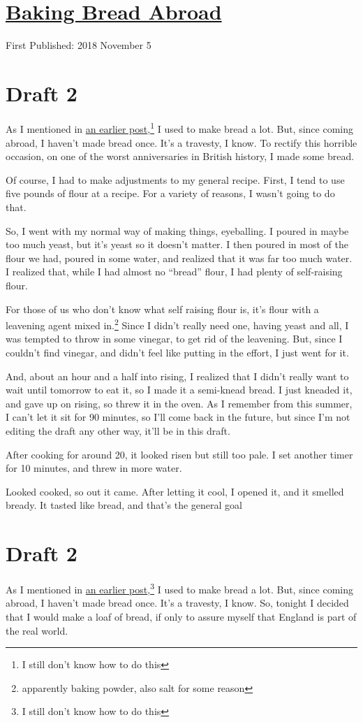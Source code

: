 \documentclass[12pt]{article}[titlepage]
\newcommand{\say}[1]{``#1''}
\newcommand{\1}{\={a}}
\newcommand{\2}{\={e}}
\newcommand{\3}{\={\i}}
\newcommand{\4}{\=o}
\newcommand{\5}{\=u}
\newcommand{\6}{\={A}}
\renewcommand{\,}{\textsuperscript{,}}
\begin{document}

\doublespacing
\section{\href{baking-bread-abroad.html}{Baking Bread Abroad}}
First Published: 2018 November 5
\section{Draft 2}
As I mentioned in \href{basic-bread-recipe.html}{an earlier post},\footnote{I still don't know how to do this} I used to make bread a lot.
But, since coming abroad, I haven't made bread once.
It's a travesty, I know.
To rectify this horrible occasion, on one of the worst anniversaries in British history, I made some bread.

Of course, I had to make adjustments to my general recipe.
First, I tend to use five pounds of flour at a recipe.
For a variety of reasons, I wasn't going to do that.

So, I went with my normal way of making things, eyeballing.
I poured in maybe too much yeast, but it's yeast so it doesn't matter.
I then poured in most of the flour we had, poured in some water, and realized that it was far too much water.
I realized that, while I had almost no \say{bread} flour, I had plenty of self-raising flour.

For those of us who don't know what self raising flour is, it's flour with a leavening agent mixed in.\footnote{apparently baking powder, also salt for some reason}
Since I didn't really need one, having yeast and all, I was tempted to throw in some vinegar, to get rid of the leavening.
But, since I couldn't find vinegar, and didn't feel like putting in the effort, I just went for it.

And, about an hour and a half into rising, I realized that I didn't really want to wait until tomorrow to eat it, so I made it a semi-knead bread.
I just kneaded it, and gave up on rising, so threw it in the oven.
As I remember from this summer, I can't let it sit for 90 minutes, so I'll come back in the future, but since I'm not editing the draft any other way, it'll be in this draft.

After cooking for around 20, it looked risen but still too pale.
I set another timer for 10 minutes, and threw in more water.

Looked cooked, so out it came.
After letting it cool, I opened it, and it smelled bready.
It tasted like bread, and that's the general goal
\section{Draft 2}
As I mentioned in \href{basic-bread-recipe.html}{an earlier post},\footnote{I still don't know how to do this} I used to make bread a lot.
But, since coming abroad, I haven't made bread once.
It's a travesty, I know.
So, tonight I decided that I would make a loaf of bread, if only to assure myself that England is part of the real world.
\end{document}
